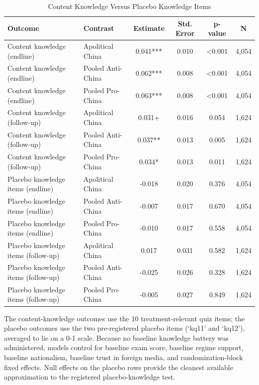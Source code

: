 \begin{table}[H]
\centering
\caption{Content Knowledge Versus Placebo Knowledge Items}
\label{tab:placebo_knowledge}
\footnotesize
\begin{threeparttable}
\begin{tabular}{llcccc}
\toprule
Outcome & Contrast & Estimate & Std. Error & p-value & N \\
\midrule
Content knowledge (endline) & Apolitical China & 0.041*** & 0.010 & <0.001 & 4,054 \\
Content knowledge (endline) & Pooled Anti-China & 0.062*** & 0.008 & <0.001 & 4,054 \\
Content knowledge (endline) & Pooled Pro-China & 0.063*** & 0.008 & <0.001 & 4,054 \\
Content knowledge (follow-up) & Apolitical China & 0.031+ & 0.016 & 0.054 & 1,624 \\
Content knowledge (follow-up) & Pooled Anti-China & 0.037** & 0.013 & 0.005 & 1,624 \\
Content knowledge (follow-up) & Pooled Pro-China & 0.034* & 0.013 & 0.011 & 1,624 \\
Placebo knowledge items (endline) & Apolitical China & -0.018 & 0.020 & 0.376 & 4,054 \\
Placebo knowledge items (endline) & Pooled Anti-China & -0.007 & 0.017 & 0.670 & 4,054 \\
Placebo knowledge items (endline) & Pooled Pro-China & -0.010 & 0.017 & 0.558 & 4,054 \\
Placebo knowledge items (follow-up) & Apolitical China & 0.017 & 0.031 & 0.582 & 1,624 \\
Placebo knowledge items (follow-up) & Pooled Anti-China & -0.025 & 0.026 & 0.328 & 1,624 \\
Placebo knowledge items (follow-up) & Pooled Pro-China & -0.005 & 0.027 & 0.849 & 1,624 \\
\bottomrule
\end{tabular}
\begin{tablenotes}[flushleft]
\footnotesize
\item The content-knowledge outcomes use the 10 treatment-relevant quiz items; the placebo outcomes use the two pre-registered placebo items (`kq11' and `kq12'), averaged to lie on a 0-1 scale. Because no baseline knowledge battery was administered, models control for baseline exam score, baseline regime support, baseline nationalism, baseline trust in foreign media, and randomization-block fixed effects. Null effects on the placebo rows provide the cleanest available approximation to the registered placebo-knowledge test.
\end{tablenotes}
\end{threeparttable}
\end{table}
